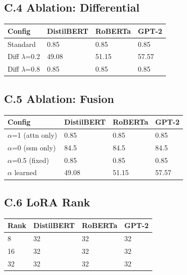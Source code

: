 \subsection{C.4 Ablation: Differential}

\begin{table}[H]
\centering
\small
\begin{tabular}{llll}
\toprule
\textbf{Config} & \textbf{DistilBERT} & \textbf{RoBERTa} & \textbf{GPT-2} \\
\midrule
Standard & 0.85 & 0.85 & 0.85 \\
Diff $\lambda$=0.2 & 49.08 & 51.15 & 57.57 \\
Diff $\lambda$=0.8 & 0.85 & 0.85 & 0.85 \\
\bottomrule
\end{tabular}
\end{table}

\subsection{C.5 Ablation: Fusion}

\begin{table}[H]
\centering
\small
\begin{tabular}{llll}
\toprule
\textbf{Config} & \textbf{DistilBERT} & \textbf{RoBERTa} & \textbf{GPT-2} \\
\midrule
$\alpha$=1 (attn only) & 0.85 & 0.85 & 0.85 \\
$\alpha$=0 (ssm only) & 84.5 & 84.5 & 84.5 \\
$\alpha$=0.5 (fixed) & 0.85 & 0.85 & 0.85 \\
$\alpha$ learned & 49.08 & 51.15 & 57.57 \\
\bottomrule
\end{tabular}
\end{table}

\subsection{C.6 LoRA Rank}

\begin{table}[H]
\centering
\small
\begin{tabular}{llll}
\toprule
\textbf{Rank} & \textbf{DistilBERT} & \textbf{RoBERTa} & \textbf{GPT-2} \\
\midrule
8 & 32 & 32 & 32 \\
16 & 32 & 32 & 32 \\
32 & 32 & 32 & 32 \\
\bottomrule
\end{tabular}
\end{table}

